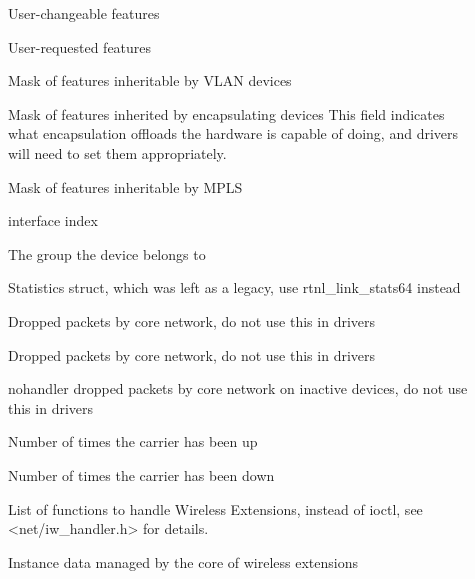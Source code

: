 \documentclass[a4paper,8pt,english]{sphinxmanual}
\begin{document}
\begin{description}
\item[{}] \leavevmode
User-changeable features

\item[{}] \leavevmode
User-requested features

\item[{}] \leavevmode
Mask of features inheritable by VLAN devices

\item[{}] \leavevmode
Mask of features inherited by encapsulating devices
This field indicates what encapsulation
offloads the hardware is capable of doing,
and drivers will need to set them appropriately.

\item[{}] \leavevmode
Mask of features inheritable by MPLS

\item[{}] \leavevmode
interface index

\item[{}] \leavevmode
The group the device belongs to

\item[{}] \leavevmode
Statistics struct, which was left as a legacy, use
rtnl\_link\_stats64 instead

\item[{}] \leavevmode
Dropped packets by core network,
do not use this in drivers

\item[{}] \leavevmode
Dropped packets by core network,
do not use this in drivers

\item[{}] \leavevmode
nohandler dropped packets by core network on
inactive devices, do not use this in drivers

\item[{}] \leavevmode
Number of times the carrier has been up

\item[{}] \leavevmode
Number of times the carrier has been down

\item[{}] \leavevmode
List of functions to handle Wireless Extensions,
instead of ioctl,
see \textless{}net/iw\_handler.h\textgreater{} for details.

\item[{}] \leavevmode
Instance data managed by the core of wireless extensions


\end{description}
\end{document}
